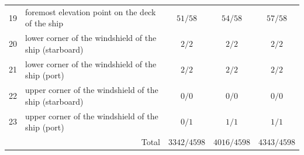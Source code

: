 \begin{table}[h]
\begin{tabular}{cl ccc}
19 & foremost elevation point on the deck of the ship & $51/58$ & $54/58$ & $57/58$ \\
20 & lower corner of the windshield of the ship (starboard) & $2/2$ & $2/2$ & $2/2$ \\
21 & lower corner of the windshield of the ship (port) & $2/2$ & $2/2$ & $2/2$ \\
22 & upper corner of the windshield of the ship (starboard) & $0/0$ & $0/0$ & $0/0$ \\
23 & upper corner of the windshield of the ship (port) & $0/1$ & $1/1$ & $1/1$ \\
\midrule
\multicolumn{2}{r}{Total} & $3342/4598$ & $4016/4598$ & $4343/4598$ \\
\bottomrule
\end{tabular}
\end{table}